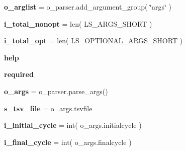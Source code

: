 \begin{DoxyCompactItemize}
\item 
{\bfseries o\+\_\+arglist} = o\+\_\+parser.\+add\+\_\+argument\+\_\+group( \char`\"{}args\char`\"{} )\hypertarget{namespacenegui_1_1pgvalidationtests_ab9f024687956a0518e72b7cb46db11c7}{}\label{namespacenegui_1_1pgvalidationtests_ab9f024687956a0518e72b7cb46db11c7}

\item 
{\bfseries i\+\_\+total\+\_\+nonopt} = len( L\+S\+\_\+\+A\+R\+G\+S\+\_\+\+S\+H\+O\+RT )\hypertarget{namespacenegui_1_1pgvalidationtests_a39cc243a19df8fa60b00814f6efaf189}{}\label{namespacenegui_1_1pgvalidationtests_a39cc243a19df8fa60b00814f6efaf189}

\item 
{\bfseries i\+\_\+total\+\_\+opt} = len( L\+S\+\_\+\+O\+P\+T\+I\+O\+N\+A\+L\+\_\+\+A\+R\+G\+S\+\_\+\+S\+H\+O\+RT )\hypertarget{namespacenegui_1_1pgvalidationtests_ad847e140356417b41911a410c3b65b08}{}\label{namespacenegui_1_1pgvalidationtests_ad847e140356417b41911a410c3b65b08}

\item 
{\bfseries help}\hypertarget{namespacenegui_1_1pgvalidationtests_abbbef1bbd31d564a71ee35f3321a437e}{}\label{namespacenegui_1_1pgvalidationtests_abbbef1bbd31d564a71ee35f3321a437e}

\item 
{\bfseries required}\hypertarget{namespacenegui_1_1pgvalidationtests_a4e6369b67884cc7838e120558917a4e2}{}\label{namespacenegui_1_1pgvalidationtests_a4e6369b67884cc7838e120558917a4e2}

\item 
{\bfseries o\+\_\+args} = o\+\_\+parser.\+parse\+\_\+args()\hypertarget{namespacenegui_1_1pgvalidationtests_abd540a5c4a3f7be3299f8e746151bce4}{}\label{namespacenegui_1_1pgvalidationtests_abd540a5c4a3f7be3299f8e746151bce4}

\item 
{\bfseries s\+\_\+tsv\+\_\+file} = o\+\_\+args.\+tsvfile\hypertarget{namespacenegui_1_1pgvalidationtests_a29b3e95bfd18429a77cbaea834a0ad77}{}\label{namespacenegui_1_1pgvalidationtests_a29b3e95bfd18429a77cbaea834a0ad77}

\item 
{\bfseries i\+\_\+initial\+\_\+cycle} = int( o\+\_\+args.\+initialcycle )\hypertarget{namespacenegui_1_1pgvalidationtests_afadb9e13827670269a693d44e6acefc1}{}\label{namespacenegui_1_1pgvalidationtests_afadb9e13827670269a693d44e6acefc1}

\item 
{\bfseries i\+\_\+final\+\_\+cycle} = int( o\+\_\+args.\+finalcycle )\hypertarget{namespacenegui_1_1pgvalidationtests_ac5cfe3d2543203419370d6e619f10652}{}\label{namespacenegui_1_1pgvalidationtests_ac5cfe3d2543203419370d6e619f10652}


\end{DoxyCompactItemize}
